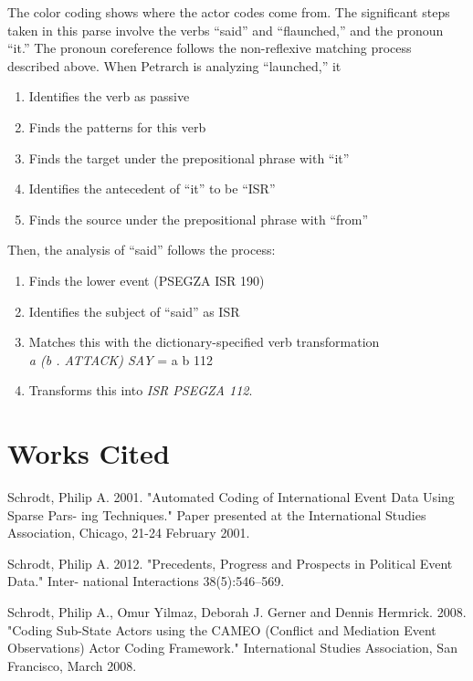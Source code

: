 \documentclass[11pt]{article}
\begin{document}
The color coding shows where the actor codes come from. The significant steps taken in this parse involve the verbs ``said'' and 
``flaunched,'' and the pronoun ``it.'' The pronoun coreference follows the 
non-reflexive matching process described above. When Petrarch is analyzing 
``launched,'' it \begin{enumerate} 
\item Identifies the verb as passive 
\item Finds the patterns for this verb
\item Finds the target under the prepositional phrase with ``it'' 
\item Identifies the antecedent of  ``it'' to be ``ISR''  
\item Finds the source under the prepositional phrase with ``from''
\end{enumerate}
Then, the analysis of ``said'' follows the process:
\begin{enumerate}
  \item Finds the lower event (PSEGZA ISR 190)
  \item Identifies the subject of ``said'' as ISR
  \item Matches this with the dictionary-specified verb transformation\\ \textit{a (b . ATTACK) SAY} 
  = a b 112
  \item Transforms this into \textit{ISR PSEGZA 112}.
\end{enumerate}

\section{Works Cited}
\begin{thebibliography}{9}

Schrodt, Philip A. 2001. "Automated Coding of International Event Data Using Sparse Pars-
ing Techniques." Paper presented at the International Studies Association, Chicago, 21-24 February 2001.

Schrodt, Philip A. 2012. "Precedents, Progress and Prospects in Political Event Data." Inter-
national Interactions 38(5):546–569.

Schrodt, Philip A., Omur Yilmaz, Deborah J. Gerner and Dennis Hermrick. 2008. "Coding Sub-State Actors using the CAMEO (Conflict and Mediation Event Observations) Actor Coding Framework." International Studies Association, San Francisco, March 2008.


\end{thebibliography}
\end{document}
